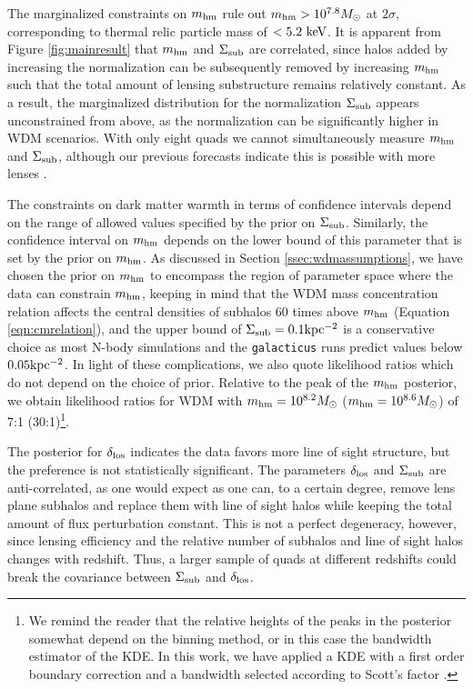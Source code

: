 The marginalized constraints on ${m_{\rm{hm}}}$ rule out ${m_{\rm{hm}}} > 10^{7.8} {M_{\odot}}$ at $2 \sigma$, corresponding to thermal relic particle mass of $<5.2 \ \rm{keV}$. It is apparent from Figure \ref{fig:mainresult} that ${m_{\rm{hm}}}$ and $\Sigma_{\rm{sub}}$ are correlated, since halos added by increasing the normalization can be subsequently removed by increasing ${m_{\rm{hm}}}$ such that the total amount of lensing substructure remains relatively constant. As a result, the marginalized distribution for the normalization $\Sigma_{\rm{sub}}$ appears unconstrained from above, as the normalization can be significantly higher in WDM scenarios. With only eight quads we cannot simultaneously measure ${m_{\rm{hm}}}$ and $\Sigma_{\rm{sub}}$, although our previous forecasts indicate this is possible with more lenses \citep{Gilman++18}. 

The constraints on dark matter warmth in terms of confidence intervals depend on the range of allowed values specified by the prior on $\Sigma_{\rm{sub}}$. Similarly, the confidence interval on ${m_{\rm{hm}}}$ depends on the lower bound of this parameter that is set by the prior on ${m_{\rm{hm}}}$. As discussed in Section \ref{ssec:wdmassumptions}, we have chosen the prior on ${m_{\rm{hm}}}$ to encompass the region of parameter space where the data can constrain ${m_{\rm{hm}}}$, keeping in mind that the WDM mass concentration relation affects the central densities of subhalos 60 times above ${m_{\rm{hm}}}$ (Equation \ref{eqn:cmrelation}), and the upper bound of $\Sigma_{\rm{sub}} = 0.1 \rm{kpc^{-2}}$ is a conservative choice as most N-body simulations and the {\tt{galacticus}} runs predict values below $0.05 \rm{kpc^{-2}}$. In light of these complications, we also quote likelihood ratios which do not depend on the choice of prior. Relative to the peak of the ${m_{\rm{hm}}}$ posterior, we obtain likelihood ratios for WDM with ${m_{\rm{hm}}} = 10^{8.2}{M_{\odot}}$ (${m_{\rm{hm}}} = 10^{8.6}{M_{\odot}}$) of 7:1 (30:1)\footnote{We remind the reader that the relative heights of the peaks in the posterior somewhat depend on the binning method, or in this case the bandwidth estimator of the KDE. In this work, we have applied a KDE with a first order boundary correction and a bandwidth selected according to Scott's factor \citep{Scott92}.}. 

The posterior for $\delta_{\rm{los}}$ indicates the data favors more line of sight structure, but the preference is not statistically significant. The parameters $\delta_{\rm{los}}$ and $\Sigma_{\rm{sub}}$ are anti-correlated, as one would expect as one can, to a certain degree, remove lens plane subhalos and replace them with line of sight halos while keeping the total amount of flux perturbation constant. This is not a perfect degeneracy, however, since lensing efficiency and the relative number of subhalos and line of sight halos changes with redshift. Thus, a larger sample of quads at different redshifts could break the covariance between $\Sigma_{\rm{sub}}$ and $\delta_{\rm{los}}$. 

